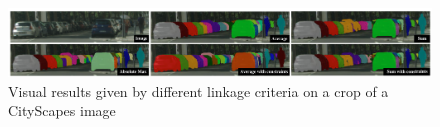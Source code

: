 \begin{figure}
\centering
\includegraphics[width=\textwidth]{./figs/cityscapes_compare_4.pdf} %
\caption{Visual results given by different \algname{} linkage criteria on a crop of a CityScapes image}\label{fig:cityscapes}
\end{figure}
